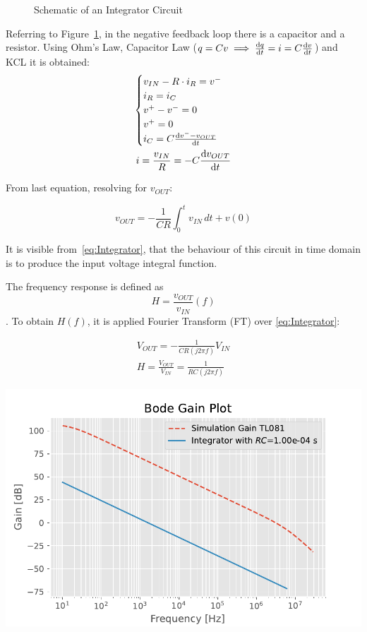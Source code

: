 \documentclass[a4paper, twocolumn]{article}
\begin{document}
\begin{figure}
    \centering
    \def\svgwidht{\columnwidth}
    
    \caption{Schematic of an Integrator Circuit}
    \label{fig:IntegrScheme}
\end{figure}

Referring to Figure~\ref{fig:IntegrScheme}, in the negative feedback loop there is a capacitor and a resistor.
Using Ohm's Law, Capacitor Law ($ q = Cv \implies \dv {q}{t}=i=C\dv{v}{t} $) and KCL it is obtained:
\begin{gather*}
    \begin{cases}
        v_{IN} - R\cdot i_R = v^-\\
        i_R=i_C\\
        v^+-v^-=0\\
        v^+=0\\
        i_C=C\dv{v^--v_{OUT}}{t}
    \end{cases}\\
    i = \frac{v_{IN}}{R}=-C\dv{v_{OUT}}{t}\\
\end{gather*}

From last equation, resolving for $v_{OUT}$:

\begin{equation}
\label{eq:Integrator}
    v_{OUT}=-\frac{1}{CR}\int_0^t{v_{IN}}\,dt + v(0)
\end{equation}

It is visible from~\eqref{eq:Integrator}, that the behaviour of this circuit in time domain is to produce the input voltage integral function.

The frequency response is defined as \[H=\frac{v_{OUT}}{v_{IN}}(f)\].
To obtain $H(f)$, it is applied Fourier Transform (FT) over \eqref{eq:Integrator}:

\begin{gather}
    V_{OUT}=-\frac{1}{CR(j2\pi f)}V_{IN}\\
    H = \frac{V_{OUT}}{V_{IN}} = \frac{1}{RC(j2\pi f)}   
\end{gather}

\begin{center}
    \includegraphics[width=\columnwidth]{def_graph/IntegratorBodeTheo.pdf}
    \label{fig:IntBodeGraphTheo}
\end{center}
\end{document}
